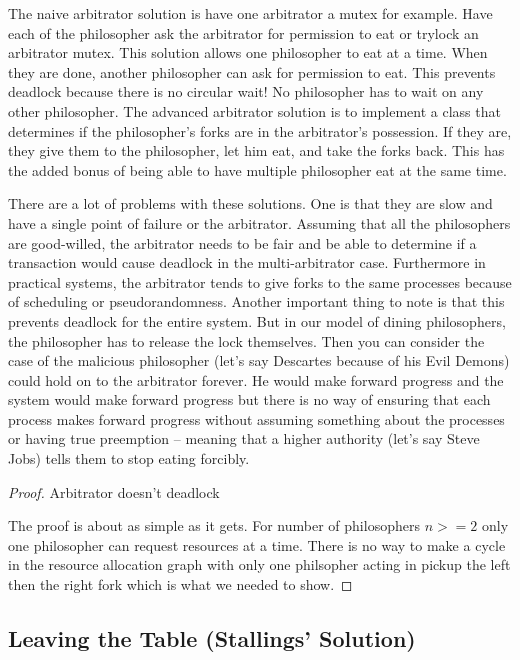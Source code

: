 The naive arbitrator solution is have one arbitrator a mutex for example.
Have each of the philosopher ask the arbitrator for permission to eat or trylock an arbitrator mutex.
This solution allows one philosopher to eat at a time.
When they are done, another philosopher can ask for permission to eat.
This prevents deadlock because there is no circular wait! No philosopher has to wait on any other philosopher.
The advanced arbitrator solution is to implement a class that determines if the philosopher's forks are in the arbitrator's possession.
If they are, they give them to the philosopher, let him eat, and take the forks back.
This has the added bonus of being able to have multiple philosopher eat at the same time.

There are a lot of problems with these solutions.
One is that they are slow and have a single point of failure or the arbitrator.
Assuming that all the philosophers are good-willed, the arbitrator needs to be fair and be able to determine if a transaction would cause deadlock in the multi-arbitrator case.
Furthermore in practical systems, the arbitrator tends to give forks to the same processes because of scheduling or pseudorandomness.
Another important thing to note is that this prevents deadlock for the entire system.
But in our model of dining philosophers, the philosopher has to release the lock themselves.
Then you can consider the case of the malicious philosopher (let's say Descartes because of his Evil Demons) could hold on to the arbitrator forever.
He would make forward progress and the system would make forward progress but there is no way of ensuring that each process makes forward progress without assuming something about the processes or having true preemption -- meaning that a higher authority (let's say Steve Jobs) tells them to stop eating forcibly.


\begin{proof} Arbitrator doesn't deadlock

The proof is about as simple as it gets. For number of philosophers $n >= 2$ only one philosopher can request resources at a time. There is no way to make a cycle in the resource allocation graph with only one philsopher acting in pickup the left then the right fork which is what we needed to show.

\end{proof}

\subsection{Leaving the Table (Stallings' Solution)}

